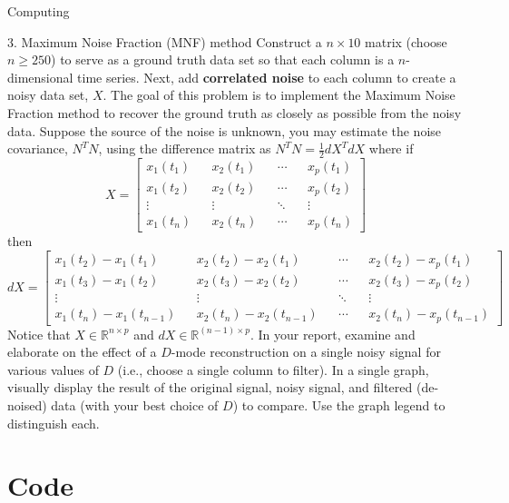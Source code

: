 \begin{section}{Computing}
\begin{homeworkSection}{3. Maximum Noise Fraction (MNF) method}
Construct a $n \times 10$ matrix (choose $n \geq 250$) to serve as a ground truth data set so that each column is a
$n$-dimensional time series. Next, add \textbf{correlated noise} to each column to create a noisy data set, $X$. The
goal of this problem is to implement the Maximum Noise Fraction method to recover the ground truth as
closely as possible from the noisy data. Suppose the source of the noise is unknown, you may estimate
the noise covariance, $N^TN$, using the difference matrix as $N^T N = \frac{1}{2} dX^TdX$ where if
$$
    X = \begin{bmatrix}
        x_1(t_1)  &&  x_2(t_1) && \cdots && x_p(t_1) \\
        x_1(t_2)  &&  x_2(t_2) && \cdots && x_p(t_2) \\
        \vdots    && \vdots    && \ddots && \vdots \\
        x_1(t_n)  &&  x_2(t_n) && \cdots && x_p(t_n)
    \end{bmatrix}
$$
then
$$
    dX = \begin{bmatrix}
        x_1(t_2)-x_1(t_1)  &&  x_2(t_2)-x_2(t_1) && \cdots && x_2(t_2) - x_p(t_1) \\
        x_1(t_3)-x_1(t_2)  &&  x_2(t_3)-x_2(t_2) && \cdots && x_2(t_3) - x_p(t_2) \\
        \vdots    && \vdots    && \ddots && \vdots \\
        x_1(t_n)-x_1(t_{n-1})  &&  x_2(t_n)-x_2(t_{n-1}) && \cdots && x_2(t_n) - x_p(t_{n-1})
    \end{bmatrix}
$$
Notice that $X \in \mathbb{R}^{n \times p}$ and $dX \in \mathbb{R}^{(n-1) \times p}$.
In your report, examine and elaborate on the effect of a $D$-mode
reconstruction on a single noisy signal for various values of $D$ (i.e., choose a single column to filter). In
a single graph, visually display the result of the original signal, noisy signal, and filtered (de-noised) data
(with your best choice of $D$) to compare. Use the graph legend to distinguish each.

\end{homeworkSection}

\end{section}
\newpage

\appendix

\section{Code}\label{code}

